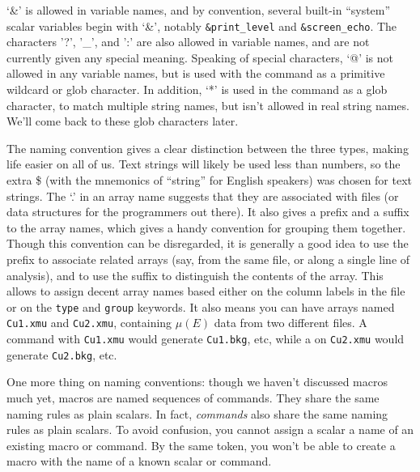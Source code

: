`\&' is allowed in variable names, and by convention, several built-in
``system'' scalar variables begin with `\&', notably {\tt{\&print\_level}}
and {\tt{\&screen\_echo}}.  The characters '?', '\_', and ':' are also
allowed in variable names, and are not currently given any special meaning.
Speaking of special characters, `@' is not allowed in any variable names,
but is used with the {} command as a primitive wildcard or glob
character.  In addition, `*' is used in the {} command as
a glob character, to match multiple string names, but isn't allowed in real
string names.  We'll come back to these glob characters later.

The naming convention gives a clear distinction between the three
types, making life easier on all of us.  Text strings will likely be
used less than numbers, so the extra {\$} (with the mnemonics of
``string'' for English speakers) was chosen for text strings.  The `.'
in an array name suggests that they are associated with files (or data
structures for the programmers out there).  It also gives a prefix and
a suffix to the array names, which gives a handy convention for
grouping them together.  Though this convention can be disregarded, it
is generally a good idea to use the prefix to associate related arrays
(say, from the same file, or along a single line of analysis), and to
use the suffix to distinguish the contents of the array.  This allows
{} to assign decent array names based either on the
column labels in the file or on the {\tt{type}} and {\tt{group}}
keywords.  It also means you can have arrays named {\tt{Cu1.xmu}} and
{\tt{Cu2.xmu}}, containing $\mu(E)$ data from two different files.  A
{} command with {\tt{Cu1.xmu}} would generate
{\tt{Cu1.bkg}}, etc, while a {} on {\tt{Cu2.xmu}} would
generate {\tt{Cu2.bkg}}, etc. 

One more thing on naming conventions: though we haven't discussed macros
much yet, macros are named sequences of {\ifeffit} commands.  They share
the same naming rules as plain scalars.   In fact, {\emph{commands}} also
share the same naming rules as plain scalars.  To avoid confusion, you
cannot assign a scalar a name of an existing macro or command.  By the same
token, you won't be able to create a macro with the name of a known scalar
or command.

